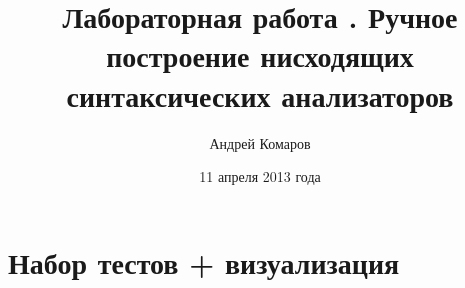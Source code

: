 \documentclass[11pt,a4paper,oneside]{article}
\begin{document}
\renewcommand{\t}[1]{\mbox{\texttt{#1}}}
\newcommand{\s}[1]{\mbox{``\t{#1}''}}
\newcommand{\eps}{\varepsilon}
\renewcommand{\phi}{\varphi}
\newcommand{\plainhat}{{\char 94}}

\newcommand{\Z}{\mathbb{Z}}
\newcommand{\w}[1]{``\t{#1}''}

\author{Андрей Комаров}
\title{Лабораторная работа . Ручное построение нисходящих синтаксических анализаторов}
\date{11 апреля 2013 года}
\maketitle





\section{Набор тестов + визуализация}

\end{document}
